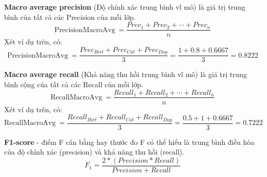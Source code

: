 \textbf{Macro average precision} (Độ chính xác trung bình vĩ mô) là giá trị trung bình của tất cả các Precision của mỗi lớp.
$$\text{PrecisionMacroAvg}\ = \frac{Prec_1 + Prec_2 + \cdots + Prec_n}{n}$$
Xét ví dụ trên, có:
$$\text{PrecisionMacroAvg}\ = \frac{Prec_{Birt} + Prec_{Cat} + Prec_{Dog}}{3} = \frac{1 + 0.8+0.6667}{3} = 0.8222$$


\textbf{Macro average recall} (Khả năng thu hồi trung bình vĩ mô) là giá trị trung bình cộng của tất cả các Recall của mỗi lớp.
$$\text{RecallMacroAvg}\ = \frac{Recall_1 + Recall_2 + \cdots + Recall_n}{n}$$
Xét ví dụ trên, có:
$$\text{RecallMacroAvg}\ = \frac{Recall_{Birt} + Recall_{Cat} + Recall_{Dog}}{3} = \frac{0.5 + 1+0.6667}{3} = 0.7222$$


\textbf{F1-score} - điểm F cân bằng hay thước đo F có thể hiểu là trung bình điều hòa của độ chính xác (precision) và khả năng thu hồi (recall).
$$F_1 = \frac{2*(Precision * Recall)}{Precision + Recall}$$